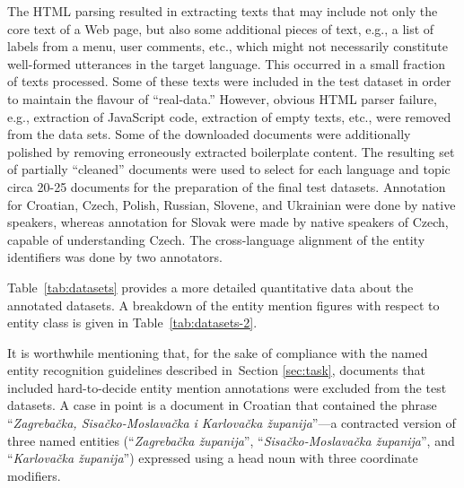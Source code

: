 \documentclass[11pt]{article}
\begin{document}
The HTML parsing resulted in extracting texts that may include not only
the core text of a Web page, but also some additional pieces of text,
e.g., a list of labels from a menu, user comments, etc., which might not
necessarily constitute well-formed utterances in the target language.
This occurred in a small fraction of texts processed.  Some of these
texts were included in the test dataset in order to maintain the flavour
of ``real-data.''  However, obvious HTML parser failure, e.g., extraction
of JavaScript code, extraction of empty texts, etc., were removed from
the data sets.  Some of the downloaded documents were additionally
polished by removing erroneously extracted boilerplate content.  The
resulting set of partially ``cleaned'' documents were used to select for
each language and topic circa 20-25 documents for the preparation of the
final test datasets.  Annotation for Croatian, Czech, Polish, Russian,
Slovene, and Ukrainian  were done by native
speakers, whereas annotation for Slovak were made by native speakers of
Czech, capable of understanding Czech.  The cross-language alignment of
the entity identifiers was done by two annotators.

Table~\ref{tab:datasets} provides a more detailed quantitative data about the annotated datasets. A breakdown 
of the entity mention figures with respect to entity class is given in Table~\ref{tab:datasets-2}. 

It is worthwhile mentioning that, for the sake of compliance with the
named entity recognition guidelines described in~Section \ref{sec:task},
documents that included hard-to-decide entity mention annotations were
excluded from the test datasets. {A case in point is a document in
  Croatian that contained the phrase ``\textit{Zagrebačka,
    Sisačko-Moslavačka i Karlovačka županija}''---a contracted version of
  three named entities (``\textit{Zagrebačka županija}'',
  ``\textit{Sisačko-Moslavačka županija}'', and ``\textit{Karlovačka
    županija}'') expressed using a head noun with three coordinate
  modifiers.}
\end{document}
